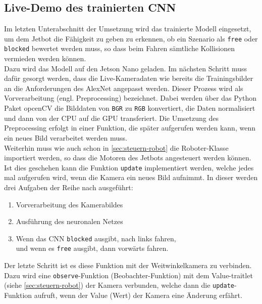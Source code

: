 \subsection{Live-Demo des trainierten CNN}

Im letzten Unterabschnitt der Umsetzung wird das trainierte Modell eingesetzt, um dem Jetbot die Fähigkeit zu geben zu erkennen, ob ein Szenario als \texttt{free} oder \texttt{blocked} bewertet werden muss, so dass beim Fahren sämtliche Kollisionen vermieden werden können. \\
Dazu wird das Modell auf den Jetson Nano geladen. Im nächsten Schritt muss dafür gesorgt werden, dass die Live-Kameradaten wie bereits die Trainingsbilder an die Anforderungen des AlexNet angepasst werden. Dieser Prozess wird als Vorverarbeitung (engl.\xspace Preprocessing) bezeichnet. Dabei werden über das Python Paket opcenCV die Bilddaten von \texttt{BGR} zu \texttt{RGB} konvertiert, die Daten normalisiert und dann von der CPU auf die GPU transferiert. Die Umsetzung des Preprocessing erfolgt in einer Funktion, die später aufgerufen werden kann, wenn ein neues Bild verarbeitet werden muss. \\
Weiterhin muss wie auch schon in \autoref{sec:steuern-robot} die Roboter-Klasse importiert werden, so dass die Motoren des Jetbots angesteuert werden können.\\
Ist dies geschehen kann die Funktion \glqq\texttt{update}\grqq{} implementiert werden, welche jedes mal aufgerufen wird, wenn die Kamera ein neues Bild aufnimmt. In dieser werden drei Aufgaben der Reihe nach ausgeführt:

\begin{enumerate}
    \item Vorverarbeitung des Kamerabildes
    \item Ausführung des neuronalen Netzes
    \item Wenn das CNN \texttt{blocked} ausgibt, nach links fahren,\\
    und wenn es \texttt{free} ausgibt, dann vorwärts fahren.
\end{enumerate}

Der letzte Schritt ist es diese Funktion mit der Weitwinkelkamera zu verbinden. Dazu wird eine \texttt{observe}-Funktion (Beobachter-Funktion) mit dem Value-traitlet (siehe \autoref{sec:steuern-robot}) der Kamera verbunden, welche dann die \texttt{update}-Funktion aufruft, wenn der Value (Wert) der Kamera eine Änderung erfährt.

